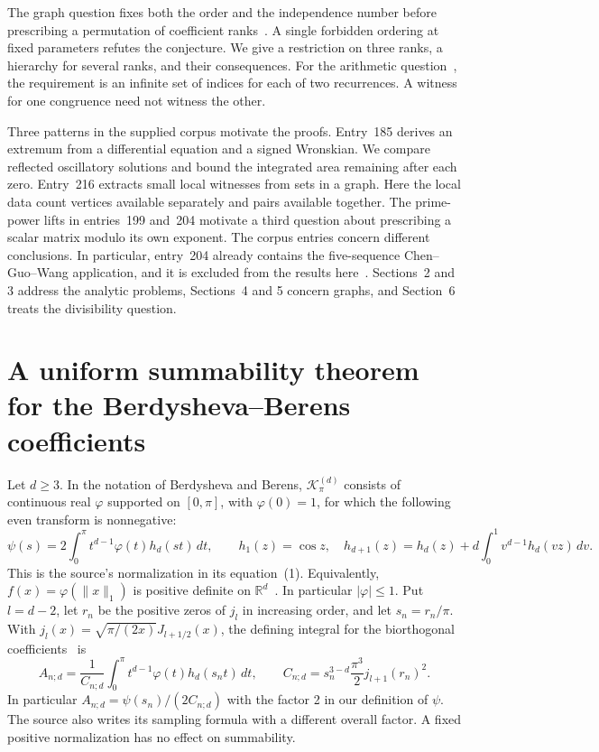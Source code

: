 \documentclass[11pt,a4paper]{article}
\theoremstyle{remark}\newtheorem{remark}[theorem]{Remark}
\numberwithin{equation}{section}
\begin{document}
The graph question fixes both the order and the independence number before prescribing a permutation of coefficient ranks~\cite[Conj.~1.5]{LMroller}. A single forbidden ordering at fixed parameters refutes the conjecture. We give a restriction on three ranks, a hierarchy for several ranks, and their consequences. For the arithmetic question~\cite[Conj.~4.4]{Sun2019}, the requirement is an infinite set of indices for each of two recurrences. A witness for one congruence need not witness the other.

Three patterns in the supplied corpus motivate the proofs. Entry~185 derives an extremum from a differential equation and a signed Wronskian. We compare reflected oscillatory solutions and bound the integrated area remaining after each zero. Entry~216 extracts small local witnesses from sets in a graph. Here the local data count vertices available separately and pairs available together. The prime-power lifts in entries~199 and~204 motivate a third question about prescribing a scalar matrix modulo its own exponent. The corpus entries concern different conclusions. In particular, entry~204 already contains the five-sequence Chen--Guo--Wang application, and it is excluded from the results here~\cite{VMRC}. Sections~2 and 3 address the analytic problems, Sections~4 and 5 concern graphs, and Section~6 treats the divisibility question.

\section{A uniform summability theorem for the Berdysheva--Berens coefficients}
\label{sec:sampling}
Let $d\ge3$. In the notation of Berdysheva and Berens, $\mathcal K_\pi^{(d)}$ consists of continuous real $\varphi$ supported on $[0,\pi]$, with $\varphi(0)=1$, for which the following even transform is nonnegative:
\[
 \psi(s)=2\int_0^\pi t^{d-1}\varphi(t)h_d(st)\,dt,\qquad
 h_1(z)=\cos z,\quad h_{d+1}(z)=h_d(z)+d\int_0^1 v^{d-1}h_d(vz)\,dv.
\]
This is the source's normalization in its equation~(1). Equivalently,
$f(x)=\varphi(\|x\|_1)$ is positive definite on $\mathbb R^d$~\cite[Sec.~3]{BB16}. In particular $|\varphi|\le1$. Put $l=d-2$, let $r_n$ be the positive zeros of $j_l$ in increasing order, and let $s_n=r_n/\pi$. With $j_l(x)=\sqrt{\pi/(2x)}J_{l+1/2}(x)$, the defining integral for the biorthogonal coefficients~\cite[pp.~69--70]{BB16} is
\begin{equation}
 A_{n;d}=\frac{1}{C_{n;d}}\int_0^\pi t^{d-1}\varphi(t)h_d(s_nt)\,dt,\qquad
 C_{n;d}=s_n^{3-d}\frac{\pi^3}{2} j_{l+1}(r_n)^2 .
 \label{eq:An}
\end{equation}
In particular $A_{n;d}=\psi(s_n)/(2C_{n;d})$ with the factor 2 in our definition of $\psi$. The source also writes its sampling formula with a different overall factor. A fixed positive normalization has no effect on summability.
\end{document}
